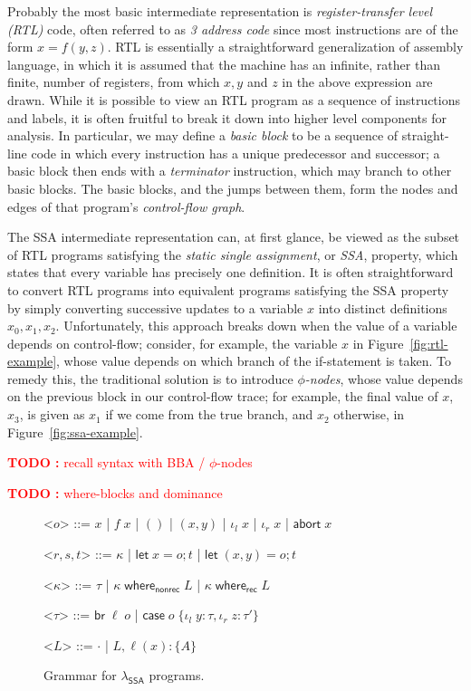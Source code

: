 \documentclass[acmsmall,screen,review]{acmart}
\newcounter{todos}
\newcommand{\TODO}[1]{{
  \stepcounter{todos}
  \begin{center}\large{\textcolor{red}{\textbf{TODO \arabic{todos}:} #1}}\end{center}
}}
\newcommand{\ms}[1]{\ensuremath{\mathsf{#1}}}
\newcommand{\lto}{:}
\newcommand{\linl}[1]{\iota_l\;{#1}}
\newcommand{\linr}[1]{\iota_r\;{#1}}
\newcommand{\labort}[1]{\ms{abort}\;{#1}}
\newcommand{\letstmt}[3]{\ensuremath{\ms{let}\;#1 = #2; #3}}
\newcommand{\brb}[2]{\ms{br}\;#1\;#2}
\newcommand{\casestmt}[5]{\ms{case}\;#1\;\{\linl{#2} \lto #3, \linr{#4} \lto #5\}}
\newcommand{\awhere}[2]{#1\;\ms{where}_{\ms{nonrec}}\;#2}
\newcommand{\cwhere}[2]{#1\;\ms{where}_{\ms{rec}}\;#2}
\newcommand{\wbranch}[3]{#1(#2) \lto \{#3\}}
\newcommand{\isotopessa}{\(\lambda_{\ms{SSA}}\)}
\begin{document}
Probably the most basic intermediate representation is \emph{register-transfer level (RTL)} code,
often referred to as \emph{3 address code} since most instructions are of the form $x = f(y, z)$.
RTL is essentially a straightforward generalization of assembly language, in which it is assumed
that the machine has an infinite, rather than finite, number of registers, from which $x, y$ and $z$
in the above expression are drawn.  While it is possible to view an RTL program as a sequence of
instructions and labels, it is often fruitful to break it down into higher level components for
analysis. In particular, we may define a \emph{basic block} to be a sequence of straight-line code
in which every instruction has a unique predecessor and successor; a basic block then ends with a
\emph{terminator} instruction, which may branch to other basic blocks. The basic blocks, and the
jumps between them, form the nodes and edges of that program's \emph{control-flow graph}.

The SSA intermediate representation can, at first glance, be viewed as the subset of RTL programs
satisfying the \emph{static single assignment}, or \emph{SSA}, property, which states that every
variable has precisely one definition. It is often straightforward to convert RTL programs into
equivalent programs satisfying the SSA property by simply converting successive updates to a
variable $x$ into distinct definitions $x_0, x_1, x_2$. Unfortunately, this approach breaks down
when the value of a variable depends on control-flow; consider, for example, the variable $x$ in
Figure~\ref{fig:rtl-example}, whose value depends on which branch of the if-statement is
taken. To remedy this, the traditional solution is to introduce \emph{$\phi$-nodes}, whose value
depends on the previous block in our control-flow trace; for example, the final value of $x$, $x_3$,
is given as $x_1$ if we come from the true branch, and $x_2$ otherwise, in
Figure~\ref{fig:ssa-example}.


\TODO{recall syntax with BBA / $\phi$-nodes}

\TODO{where-blocks and dominance}

\begin{figure}
  \begin{grammar}
    <\(o\)> ::= \(x\)
      \;|\; \(f\;x\)
      \;|\; \(()\)
      \;|\; \((x, y)\)
      \;|\;  \(\linl{x}\)
      \;|\; \(\linr{x}\)
      \;|\; \(\labort{x}\)

    <\(r, s, t\)> ::= \(\kappa\)
      \;|\; \(\letstmt{x}{o}{t}\)
      \;|\; \(\letstmt{(x, y)}{o}{t}\)

    <\(\kappa\)> ::= \(\tau\) \;|\; \(\awhere{\kappa}{L}\) \;|\; \(\cwhere{\kappa}{L}\)

    <\(\tau\)> ::= \(\brb{\ell}{o}\)
      \;|\; \(\casestmt{o}{y}{\tau}{z}{\tau'}\)

    <\(L\)> ::= \(\cdot\) \;|\; \(L, \wbranch{\ell}{x}{A}\)
  \end{grammar}
  \caption{Grammar for \isotopessa{} programs.}
  \Description{}
  \label{fig:ssa-syntax}
\end{figure}
\end{document}
